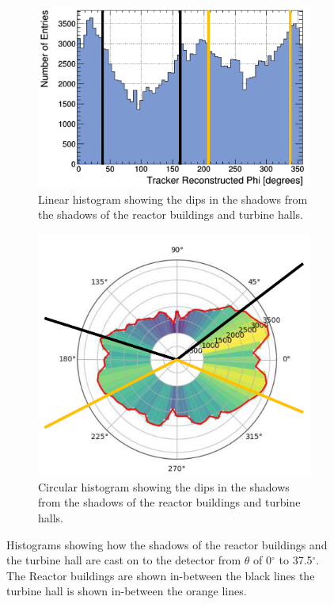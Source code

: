 \begin{figure}[H]
\centering
\begin{subfigure}{.5\textwidth}
  \centering
  \includegraphics[width=\linewidth]{Chapter5/Figs/Raster/linReversedWylfaSlice0-37.5.png}
  \captionsetup{width=.9\linewidth}
  \caption{Linear histogram showing the dips in the shadows from the shadows of the reactor buildings and turbine halls.}
  \label{subFig:linReversedWylfaSlice0-37.5}
\end{subfigure}%
\begin{subfigure}{.5\textwidth}
  \centering
  \includegraphics[width=0.765\linewidth]{Chapter5/Figs/Raster/cirReversedWylfaSlice0-37.5.png}
  \captionsetup{width=.9\linewidth}
  \caption{Circular histogram showing the dips in the shadows from the shadows of the reactor buildings and turbine halls.}
  \label{subFig:cirReversedWylfaSlice0-37.5}
\end{subfigure}
 \caption{Histograms showing how the shadows of the reactor buildings and the turbine hall are cast on to the detector from $\theta$ of 0$^\circ$ to 37.5$^\circ$. The Reactor buildings are shown in-between the black lines the turbine hall is shown in-between the orange lines.}
\label{fig:WylfaSlice0-37.5}
\end{figure}

